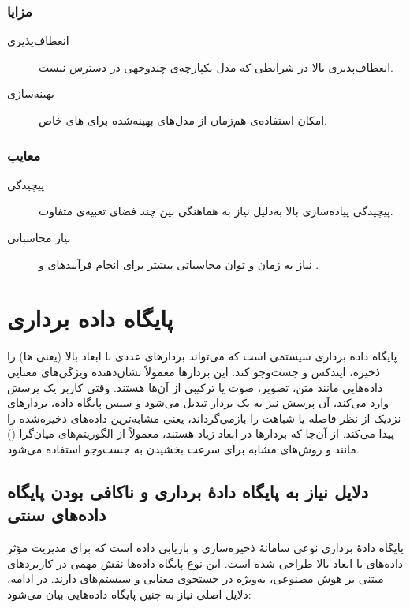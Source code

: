 \documentclass{article}
\begin{document}
\subsubsection{مزایا}
\begin{description}
\item[انعطاف‌پذیری] انعطاف‌پذیری بالا در شرایطی که مدل یکپارچه‌ی چندوجهی در دسترس نیست.

\item[بهینه‌سازی] امکان استفاده‌ی هم‌زمان از مدل‌های بهینه‌شده برای های خاص.

\end{description}

\subsubsection{معایب}
\begin{description}
\item[پیچیدگی] پیچیدگی پیاده‌سازی بالا به‌دلیل نیاز به هماهنگی بین چند فضای تعبیه‌ی متفاوت.

\item[نیاز محاسباتی] نیاز به زمان و توان محاسباتی بیشتر برای انجام فرآیندهای  و .

\end{description}




\section{پایگاه داده برداری}
پایگاه داده برداری سیستمی است که می‌تواند بردارهای عددی با ابعاد بالا (یعنی ها) را ذخیره، ایندکس و جست‌وجو کند.
این بردارها معمولاً نشان‌دهنده ویژگی‌های معنایی داده‌هایی مانند متن، تصویر، صوت یا ترکیبی از آن‌ها هستند.
وقتی کاربر یک پرسش وارد می‌کند، آن پرسش نیز به یک بردار تبدیل می‌شود و سپس پایگاه داده، بردارهای نزدیک از نظر فاصله یا شباهت را بازمی‌گرداند، یعنی مشابه‌ترین داده‌های ذخیره‌شده را پیدا می‌کند.
از آن‌جا که بردارها در ابعاد زیاد هستند، معمولاً از الگوریتم‌های میان‌گرا () مانند  و روش‌های مشابه برای سرعت بخشیدن به جست‌وجو استفاده می‌شود.
\subsection{دلایل نیاز به پایگاه دادهٔ برداری و ناکافی بودن پایگاه داده‌های سنتی}
پایگاه دادهٔ برداری نوعی سامانهٔ ذخیره‌سازی و بازیابی داده است که برای مدیریت مؤثر داده‌های با ابعاد بالا طراحی شده است.
این نوع پایگاه داده‌ها نقش مهمی در کاربردهای مبتنی بر هوش مصنوعی، به‌ویژه در جستجوی معنایی و سیستم‌های  دارند.
در ادامه، دلایل اصلی نیاز به چنین پایگاه داده‌هایی بیان می‌شود:
\end{document}
